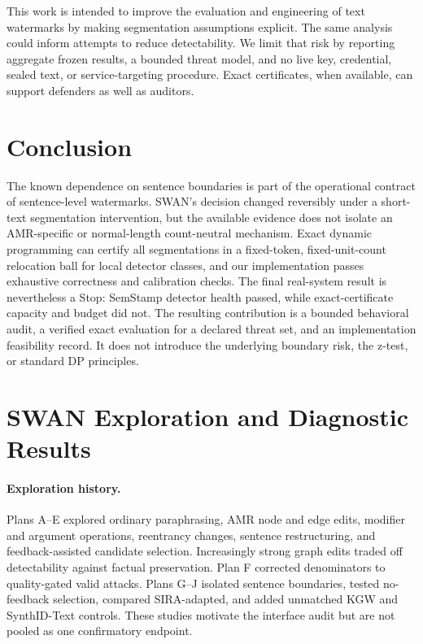 \documentclass[10pt]{article}
\begin{document}
This work is intended to improve the evaluation and engineering of text
watermarks by making segmentation assumptions explicit. The same analysis
could inform attempts to reduce detectability. We limit that risk by
reporting aggregate frozen results, a bounded threat model, and no live key,
credential, sealed text, or service-targeting procedure. Exact certificates,
when available, can support defenders as well as auditors.

\section{Conclusion}

The known dependence on sentence boundaries is part of the operational
contract of sentence-level watermarks. SWAN's decision changed reversibly under a short-text
segmentation intervention, but the available evidence does not isolate an
AMR-specific or normal-length count-neutral mechanism. Exact dynamic
programming can certify all segmentations in a fixed-token,
fixed-unit-count relocation ball for local detector classes, and our
implementation passes exhaustive correctness and calibration checks. The
final real-system result is nevertheless a Stop: SemStamp detector health
passed, while exact-certificate capacity and budget did not. The resulting
contribution is a bounded behavioral audit, a verified exact evaluation for
a declared threat set, and an implementation feasibility record. It does
not introduce the underlying boundary risk, the z-test, or standard DP
principles.




\appendix

\section{SWAN Exploration and Diagnostic Results}

\paragraph{Exploration history.}
Plans A--E explored ordinary paraphrasing, AMR node and edge edits, modifier
and argument operations, reentrancy changes, sentence restructuring, and
feedback-assisted candidate selection. Increasingly strong graph edits traded
off detectability against factual preservation. Plan F corrected denominators
to quality-gated valid attacks. Plans G--J isolated sentence boundaries,
tested no-feedback selection, compared SIRA-adapted, and added unmatched KGW
and SynthID-Text controls. These studies motivate the interface audit but are
not pooled as one confirmatory endpoint.
\end{document}
